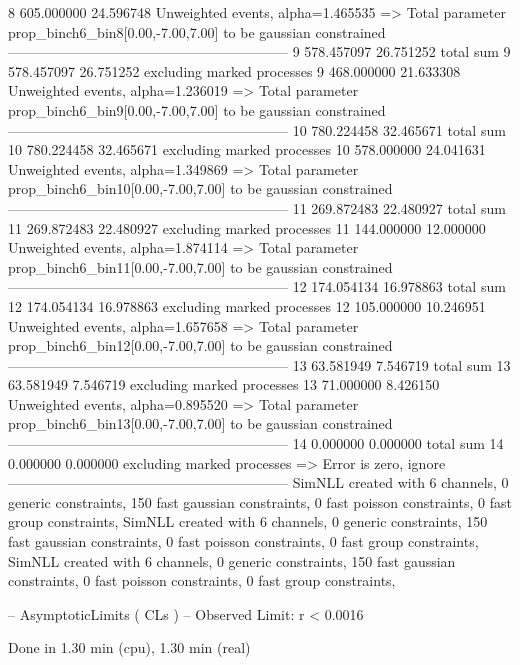 8          605.000000      24.596748       Unweighted events, alpha=1.465535
  => Total parameter prop_binch6_bin8[0.00,-7.00,7.00] to be gaussian constrained
------------------------------------------------------------
9          578.457097      26.751252       total sum                     
9          578.457097      26.751252       excluding marked processes    
9          468.000000      21.633308       Unweighted events, alpha=1.236019
  => Total parameter prop_binch6_bin9[0.00,-7.00,7.00] to be gaussian constrained
------------------------------------------------------------
10         780.224458      32.465671       total sum                     
10         780.224458      32.465671       excluding marked processes    
10         578.000000      24.041631       Unweighted events, alpha=1.349869
  => Total parameter prop_binch6_bin10[0.00,-7.00,7.00] to be gaussian constrained
------------------------------------------------------------
11         269.872483      22.480927       total sum                     
11         269.872483      22.480927       excluding marked processes    
11         144.000000      12.000000       Unweighted events, alpha=1.874114
  => Total parameter prop_binch6_bin11[0.00,-7.00,7.00] to be gaussian constrained
------------------------------------------------------------
12         174.054134      16.978863       total sum                     
12         174.054134      16.978863       excluding marked processes    
12         105.000000      10.246951       Unweighted events, alpha=1.657658
  => Total parameter prop_binch6_bin12[0.00,-7.00,7.00] to be gaussian constrained
------------------------------------------------------------
13         63.581949       7.546719        total sum                     
13         63.581949       7.546719        excluding marked processes    
13         71.000000       8.426150        Unweighted events, alpha=0.895520
  => Total parameter prop_binch6_bin13[0.00,-7.00,7.00] to be gaussian constrained
------------------------------------------------------------
14         0.000000        0.000000        total sum                     
14         0.000000        0.000000        excluding marked processes    
  => Error is zero, ignore      
------------------------------------------------------------
SimNLL created with 6 channels, 0 generic constraints, 150 fast gaussian constraints, 0 fast poisson constraints, 0 fast group constraints, 
SimNLL created with 6 channels, 0 generic constraints, 150 fast gaussian constraints, 0 fast poisson constraints, 0 fast group constraints, 
SimNLL created with 6 channels, 0 generic constraints, 150 fast gaussian constraints, 0 fast poisson constraints, 0 fast group constraints, 

 -- AsymptoticLimits ( CLs ) --
Observed Limit: r < 0.0016

Done in 1.30 min (cpu), 1.30 min (real)
